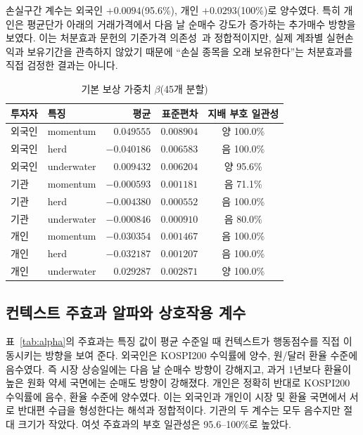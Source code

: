 \documentclass[sigconf,nonacm]{acmart}
\begin{document}
손실구간 계수는 외국인 $+0.0094$(95.6\%), 개인 $+0.0293$(100\%)로 양수였다.
특히 개인은 평균단가 아래의 거래가격에서 다음 날 순매수 강도가 증가하는 추가매수
방향을 보였다. 이는 처분효과 문헌의 기준가격 의존성~\cite{shefrin1985disposition}과
정합적이지만, 실제 계좌별 실현손익과 보유기간을 관측하지 않았기 때문에 ``손실
종목을 오래 보유한다''는 처분효과를 직접 검정한 결과는 아니다.

\begin{table}[t]
  \caption{기본 보상 가중치 $\beta$(45개 분할)}
  \label{tab:beta}
  \centering
  \small
  \begin{tabular}{@{}llrrc@{}}
    \toprule
    투자자 & 특징 & 평균 & 표준편차 & 지배 부호 일관성 \\
    \midrule
    외국인 & momentum   &  $0.049555$ & $0.008904$ & 양 100.0\% \\
    외국인 & herd       & $-0.040186$ & $0.006583$ & 음 100.0\% \\
    외국인 & underwater &  $0.009432$ & $0.006204$ & 양 95.6\% \\
    기관   & momentum   & $-0.000593$ & $0.001181$ & 음 71.1\% \\
    기관   & herd       & $-0.004380$ & $0.000552$ & 음 100.0\% \\
    기관   & underwater & $-0.000846$ & $0.000910$ & 음 80.0\% \\
    개인   & momentum   & $-0.030354$ & $0.001467$ & 음 100.0\% \\
    개인   & herd       & $-0.032187$ & $0.001207$ & 음 100.0\% \\
    개인   & underwater &  $0.029287$ & $0.002871$ & 양 100.0\% \\
    \bottomrule
  \end{tabular}
\end{table}

\subsection{컨텍스트 주효과 알파와 상호작용 계수}

표~\ref{tab:alpha}의 주효과는 특징 값이 평균 수준일 때 컨텍스트가 행동점수를 직접
이동시키는 방향을 보여 준다. 외국인은 KOSPI200 수익률에 양수, 원/달러 환율
수준에 음수였다. 즉 시장 상승일에는 다음 날 순매수 방향이 강해지고, 과거 1년보다
환율이 높은 원화 약세 국면에는 순매도 방향이 강해졌다. 개인은 정확히 반대로
KOSPI200 수익률에 음수, 환율 수준에 양수였다. 이는 외국인과 개인이 시장 및
환율 국면에서 서로 반대편 수급을 형성한다는 해석과 정합적이다. 기관의 두 계수는
모두 음수지만 절대 크기가 작았다. 여섯 주효과의 부호 일관성은 95.6--100\%로
높았다.
\end{document}
